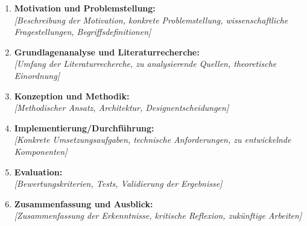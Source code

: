 \begin{enumerate}
    \item \textbf{Motivation und Problemstellung:}\\
      \textit{[Beschreibung der Motivation, konkrete Problemstellung, wissenschaftliche Fragestellungen, Begriffsdefinitionen]}
    
    \item \textbf{Grundlagenanalyse und Literaturrecherche:}\\
      \textit{[Umfang der Literaturrecherche, zu analysierende Quellen, theoretische Einordnung]}

    \item \textbf{Konzeption und Methodik:}\\
      \textit{[Methodischer Ansatz, Architektur, Designentscheidungen]}

    \item \textbf{Implementierung/Durchführung:}\\
      \textit{[Konkrete Umsetzungsaufgaben, technische Anforderungen, zu entwickelnde Komponenten]}

    \item \textbf{Evaluation:}\\
      \textit{[Bewertungskriterien, Tests, Validierung der Ergebnisse]}

    \item \textbf{Zusammenfassung und Ausblick:}\\
      \textit{[Zusammenfassung der Erkenntnisse, kritische Reflexion, zukünftige Arbeiten]}
  \end{enumerate}

\endgroup

\vspace*{\fill}
\clearpage
\thispagestyle{empty}

